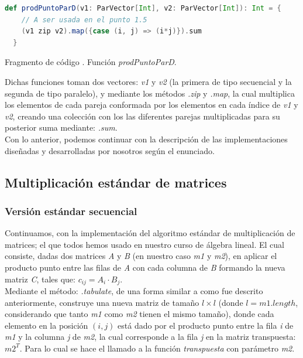 \documentclass{article}
\newcounter{codesnippet}
\newcommand{\newcodesnippet}{%
  \stepcounter{codesnippet}%
}
\begin{document}
\newcodesnippet
\begin{lstlisting}[language=Scala]
  def prodPuntoParD(v1: ParVector[Int], v2: ParVector[Int]): Int = {
    // A ser usada en el punto 1.5
    (v1 zip v2).map({case (i, j) => (i*j)}).sum
  }
\end{lstlisting}
\begin{center}
    \small{Fragmento de código \thecodesnippet. Función \textit{prodPuntoParD}.}
\end{center}

Dichas funciones toman dos vectores: \textit{v1} y \textit{v2} (la primera de tipo secuencial y la segunda de tipo paralelo), y mediante los métodos \textit{.zip} y \textit{.map}, la cual multiplica los elementos de cada pareja conformada por los elementos en cada índice de \textit{v1} y \textit{v2}, creando una colección con los las diferentes parejas multiplicadas para su posterior suma mediante: \textit{.sum}. \\

Con lo anterior, podemos continuar con la descripción de las implementaciones diseñadas y desarrolladas por nosotros según el enunciado.

\subsection{Multiplicación estándar de matrices}
\subsubsection{Versión estándar secuencial}

Continuamos, con la implementación del algoritmo estándar de multiplicación de matrices; el que todos hemos usado en nuestro curso de álgebra lineal. El cual consiste, dadas dos matrices \textit{A} y \textit{B} (en nuestro caso \textit{m1} y \textit{m2}), en aplicar el producto punto entre las filas de \textit{A} con cada columna de \textit{B} formando la nueva matriz \textit{C}, tales que: \(c_{ij} = A_i \cdot B_j \). \\ 

Mediante el método: \textit{.tabulate}, de una forma similar a como fue descrito anteriormente, construye una nueva matriz de tamaño \(l \times l\) (donde \(l = m1.length\), considerando que tanto \textit{m1} como \textit{m2} tienen el mismo tamaño), donde cada elemento en la posición \((i,j)\) está dado por el producto punto entre la fila \textit{i} de \textit{m1} y la columna \textit{j} de \textit{m2}, la cual corresponde a la fila \textit{j} en la matriz transpuesta: \(m2^T\). Para lo cual se hace el llamado a la función \textit{transpuesta} con parámetro \textit{m2}.\\
\end{document}
